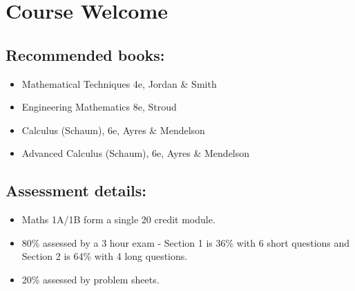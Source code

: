 
\section{Course Welcome}
\subsection{Recommended books:}
\begin{itemize}
    \item Mathematical Techniques 4e, Jordan \& Smith
    \item Engineering Mathematics 8e, Stroud
    \item Calculus (Schaum), 6e, Ayres \& Mendelson
    \item Advanced Calculus (Schaum), 6e, Ayres \& Mendelson
\end{itemize}

\subsection{Assessment details:}
\begin{itemize}
    \item Maths 1A/1B form a single 20 credit module.
    \item 80\% assessed by a 3 hour exam - Section 1 is 36\% with 6 short questions and Section 2 is 64\% with 4 long questions.
    \item 20\% assessed by problem sheets.
\end{itemize}

